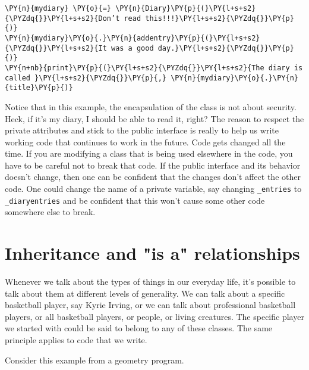 \begin{Verbatim}[commandchars=\\\{\}]
\PY{n}{mydiary} \PY{o}{=} \PY{n}{Diary}\PY{p}{(}\PY{l+s+s2}{\PYZdq{}}\PY{l+s+s2}{Don’t read this!!!}\PY{l+s+s2}{\PYZdq{}}\PY{p}{)}
\PY{n}{mydiary}\PY{o}{.}\PY{n}{addentry}\PY{p}{(}\PY{l+s+s2}{\PYZdq{}}\PY{l+s+s2}{It was a good day.}\PY{l+s+s2}{\PYZdq{}}\PY{p}{)}
\PY{n+nb}{print}\PY{p}{(}\PY{l+s+s2}{\PYZdq{}}\PY{l+s+s2}{The diary is called }\PY{l+s+s2}{\PYZdq{}}\PY{p}{,} \PY{n}{mydiary}\PY{o}{.}\PY{n}{title}\PY{p}{)}
\end{Verbatim}



Notice that in this example, the encapsulation of the class is not about security.  Heck, if it’s my diary, I should be able to read it, right?  The reason to respect the private attributes and stick to the public interface is really to help us write working code that continues to work in the future.  Code gets changed all the time.  If you are modifying a class that is being used elsewhere in the code, you have to be careful not to break that code.  If the public interface and its behavior doesn’t change, then one can be confident that the changes don’t affect the other code.  One could change the name of a private variable, say changing \texttt{\_entries} to \texttt{\_diaryentries} and be confident that this won’t cause some other code somewhere else to break.

\section{Inheritance and "is a" relationships}


Whenever we talk about the types of things in our everyday life, it’s possible to talk about them at different levels of generality.  We can talk about a specific basketball player, say Kyrie Irving, or we can talk about professional basketball players, or all basketball players, or people, or living creatures.  The specific player we started with could be said to belong to any of these classes.  The same principle applies to code that we write.  


Consider this example from a geometry program.

